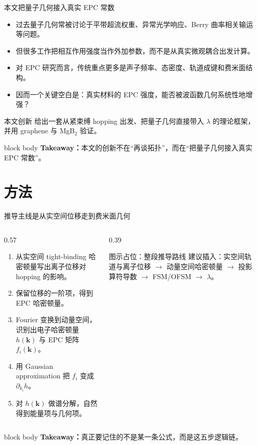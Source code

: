 \documentclass[aspectratio=169,11pt,UTF8]{ctexbeamer}
\newcommand{\takeaway}[1]{%
  \vfill
  \begin{beamercolorbox}[wd=\textwidth,sep=0.7ex,rounded=true]{block body}
    \small\textbf{Takeaway：}#1
  \end{beamercolorbox}
}
\newcommand{\figureplaceholder}[2]{%
  \begin{block}{图示占位：#1}
    \small #2
  \end{block}
}
\begin{document}
\begin{frame}{本文把量子几何接入真实 EPC 常数}
  \begin{itemize}
    \item 过去量子几何常被讨论于平带超流权重、异常光学响应、Berry 曲率相关输运等问题。
    \item 但很多工作把相互作用强度当作外加参数，而不是从真实微观耦合出发计算。
    \item 对 EPC 研究而言，传统重点更多是声子频率、态密度、轨道成键和费米面结构。
    \item 因而一个关键空白是：\alert{真实材料的 EPC 强度，能否被波函数几何系统性地增强？}
  \end{itemize}
  \begin{block}{本文创新}
    给出一套从紧束缚 hopping 出发、把量子几何直接带入 $\lambda$ 的理论框架，并用 graphene 与 MgB$_2$ 验证。
  \end{block}
  \takeaway{本文的创新不在“再谈拓扑”，而在“把量子几何接入真实 EPC 常数”。}
\end{frame}

\section{方法}

\begin{frame}{推导主线是从实空间位移走到费米面几何}
  \begin{columns}[T]
    \begin{column}{0.57\textwidth}
      \begin{enumerate}
        \item 从实空间 tight-binding 哈密顿量写出离子位移对 hopping 的影响。
        \item 保留位移的一阶项，得到 EPC 哈密顿量。
        \item Fourier 变换到动量空间，识别出电子哈密顿量 $h(\mathbf{k})$ 与 EPC 矩阵 $f_i(\mathbf{k})$。
        \item 用 Gaussian approximation 把 $f_i$ 变成 $\partial_{k_i} h$。
        \item 对 $h(\mathbf{k})$ 做谱分解，自然得到能量项与几何项。
      \end{enumerate}
    \end{column}
    \begin{column}{0.39\textwidth}
      \figureplaceholder{整段推导路线}{
        建议插入：实空间轨道与离子位移 $\rightarrow$ 动量空间哈密顿量 $\rightarrow$ 投影算符导数 $\rightarrow$ FSM/OFSM $\rightarrow$ $\lambda$。
      }
    \end{column}
  \end{columns}
  \takeaway{真正要记住的不是某一条公式，而是这五步逻辑链。}
\end{frame}
\end{document}
